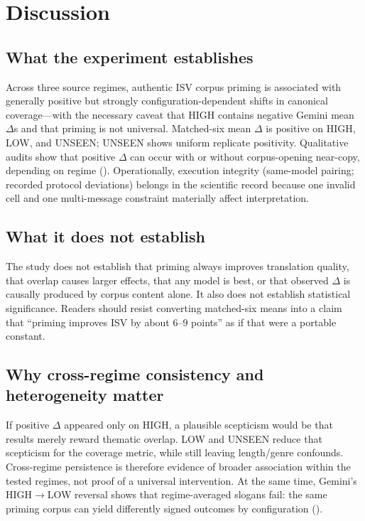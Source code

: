 \section{Discussion}
\label{sec:discussion}

\subsection{What the experiment establishes}
Across three source regimes, authentic ISV corpus priming is associated with generally positive but strongly configuration-dependent shifts in canonical coverage---with the necessary caveat that HIGH contains negative Gemini mean $\Delta$s and that priming is not universal.
Matched-six mean $\Delta$ is positive on HIGH, LOW, and UNSEEN; UNSEEN shows uniform replicate positivity.
Qualitative audits show that positive $\Delta$ can occur with or without corpus-opening near-copy, depending on regime ().
Operationally, execution integrity (same-model pairing; recorded protocol deviations) belongs in the scientific record because one invalid cell and one multi-message constraint materially affect interpretation.

\subsection{What it does not establish}
The study does not establish that priming always improves translation quality, that overlap causes larger effects, that any model is best, or that observed $\Delta$ is causally produced by corpus content alone.
It also does not establish statistical significance.
Readers should resist converting matched-six means into a claim that ``priming improves ISV by about 6--9 points'' as if that were a portable constant.

\subsection{Why cross-regime consistency and heterogeneity matter}
If positive $\Delta$ appeared only on HIGH, a plausible scepticism would be that results merely reward thematic overlap.
LOW and UNSEEN reduce that scepticism for the coverage metric, while still leaving length/genre confounds.
Cross-regime persistence is therefore evidence of broader association within the tested regimes, not proof of a universal intervention.
At the same time, Gemini's HIGH$\rightarrow$LOW reversal shows that regime-averaged slogans fail: the same priming corpus can yield differently signed outcomes by configuration ().

